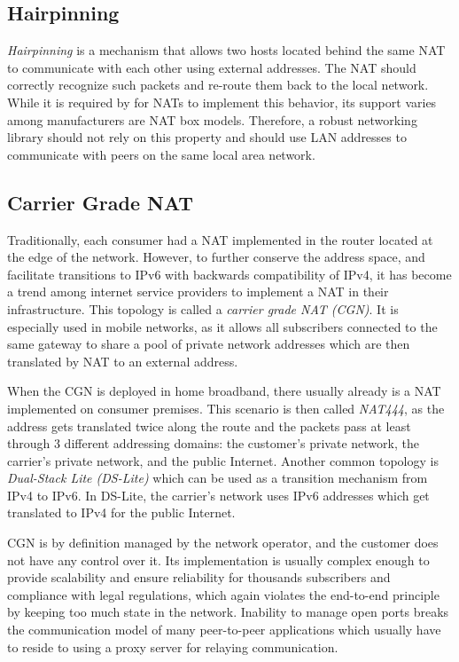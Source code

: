 
\subsection{Hairpinning}

\textit{Hairpinning} is a  mechanism that allows two hosts located behind the same NAT to communicate with each other using external addresses. The NAT should correctly recognize such packets and re-route them back to the local network. While it is required by \cite{behave} for NATs to implement this behavior, its support varies among manufacturers are NAT box models. Therefore, a robust networking library should not rely on this property and should use LAN addresses to communicate with peers on the same local area network.


\subsection{Carrier Grade NAT}

Traditionally, each consumer had a NAT implemented in the router located at the edge of the network. However, to further conserve the address space, and facilitate transitions to IPv6 with backwards compatibility of IPv4, it has become a trend among internet service providers to implement a NAT in their infrastructure. This topology is called a \textit{carrier grade NAT (CGN)}. It is especially used in mobile networks, as it allows all subscribers connected to the same gateway to share a pool of private network addresses which are then translated by NAT to an external address.

When the CGN is deployed in home broadband, there usually already is a NAT implemented on consumer premises. This scenario is then called \textit{NAT444}, as the address gets translated twice along the route and the packets pass at least through 3 different addressing domains: the customer's private network, the carrier's private network, and the public Internet. Another common topology is \textit{Dual-Stack Lite (DS-Lite)} which can be used as a transition mechanism from IPv4 to IPv6. In DS-Lite, the carrier's network uses IPv6 addresses which get translated to IPv4 for the public Internet.

CGN is by definition managed by the network operator, and the customer does not have any control over it. Its implementation is usually complex enough to provide scalability and ensure reliability for thousands subscribers and compliance with legal regulations, which again violates the end-to-end principle by keeping too much state in the network. Inability to manage open ports breaks the communication model of many peer-to-peer applications which usually have to reside to using a proxy server for relaying communication.

